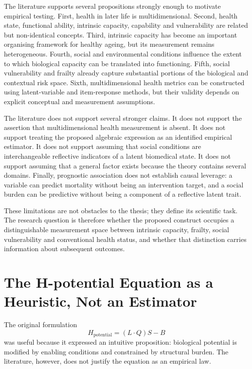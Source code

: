 The literature supports several propositions strongly enough to motivate empirical testing. First, health in later life is multidimensional. Second, health state, functional ability, intrinsic capacity, capability and vulnerability are related but non-identical concepts. Third, intrinsic capacity has become an important organising framework for healthy ageing, but its measurement remains heterogeneous. Fourth, social and environmental conditions influence the extent to which biological capacity can be translated into functioning. Fifth, social vulnerability and frailty already capture substantial portions of the biological and contextual risk space. Sixth, multidimensional health metrics can be constructed using latent-variable and item-response methods, but their validity depends on explicit conceptual and measurement assumptions.

The literature does not support several stronger claims. It does not support the assertion that multidimensional health measurement is absent. It does not support treating the proposed algebraic expression as an identified empirical estimator. It does not support assuming that social conditions are interchangeable reflective indicators of a latent biomedical state. It does not support assuming that a general factor exists because the theory contains several domains. Finally, prognostic association does not establish causal leverage: a variable can predict mortality without being an intervention target, and a social burden can be predictive without being a component of a reflective latent trait.

These limitations are not obstacles to the thesis; they define its scientific task. The research question is therefore whether the proposed construct occupies a distinguishable measurement space between intrinsic capacity, frailty, social vulnerability and conventional health status, and whether that distinction carries information about subsequent outcomes.

\section{The H-potential Equation as a Heuristic, Not an Estimator}

The original formulation
\begin{equation}
H_{\text{potential}}=(L\cdot Q)S-B
\end{equation}
was useful because it expressed an intuitive proposition: biological potential is modified by enabling conditions and constrained by structural burden. The literature, however, does not justify the equation as an empirical law.

